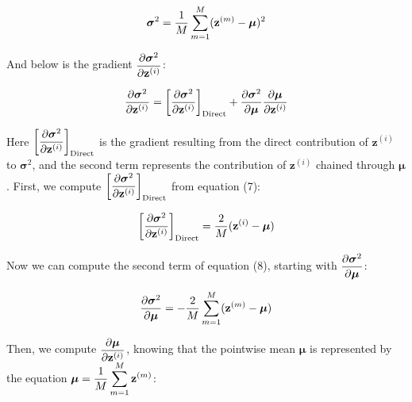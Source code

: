 \documentclass{article}
\begin{document}
\begin{multicols}{2}
\begin{equation}
    \boldsymbol{\sigma}^2 = {1\over M} 
    \sum_{m = 1}^M (\textbf{z}^{(m)} - \boldsymbol{\mu})^2
\end{equation}

And below is the gradient $\begin{aligned}
    {\partial \boldsymbol{\sigma}^2 \over \partial \textbf{z}^{(i)}}
\end{aligned}$:

\begin{equation}
    {\partial \boldsymbol{\sigma}^2 \over \partial \textbf{z}^{(i)}} = 
    \bigg[{\partial \boldsymbol{\sigma}^2 \over \partial \textbf{z}^{(i)}} \bigg]_{\text{Direct}}
    + {\partial \boldsymbol{\sigma}^2 \over \partial \boldsymbol{\mu}}
    {\partial \boldsymbol{\mu} \over \partial \textbf{z}^{(i)}}
\end{equation}

Here $\begin{aligned}
    \bigg[{\partial \boldsymbol{\sigma}^2 \over \partial \textbf{z}^{(i)}} \bigg]_{\text{Direct}}
\end{aligned}$ is the gradient resulting from the direct contribution of
$\textbf{z}^{(i)}$ to $\boldsymbol{\sigma}^2$, and the second term represents
the contribution of $\textbf{z}^{(i)}$ chained through $\boldsymbol{\mu}$.
First, we compute $\begin{aligned}
    \bigg[{\partial \boldsymbol{\sigma}^2 \over \partial \textbf{z}^{(i)}} \bigg]_{\text{Direct}}
\end{aligned}$ from equation (7):

\begin{equation}
    \bigg[{\partial \boldsymbol{\sigma}^2 \over \partial \textbf{z}^{(i)}} \bigg]_{\text{Direct}} =
    {2 \over M} (\textbf{z}^{(i)} - \boldsymbol{\mu}) \notag
\end{equation}

Now we can compute the second term of equation (8), starting with 
$\begin{aligned}
    {\partial \boldsymbol{\sigma}^2 \over \partial \boldsymbol{\mu}}
\end{aligned}$:

\begin{equation}
    {\partial \boldsymbol{\sigma}^2 \over \partial \boldsymbol{\mu}} = 
    -{2 \over M} \sum_{m=1}^M (\textbf{z}^{(m)} - \boldsymbol{\mu}) \notag
\end{equation}

Then, we compute $\begin{aligned}
    {\partial \boldsymbol{\mu} \over \partial \textbf{z}^{(i)}}
\end{aligned}$, knowing that the pointwise mean $\boldsymbol{\mu}$ is represented by the equation $\begin{aligned}
    \boldsymbol{\mu} = {1\over M} \sum_{m=1}^M\textbf{z}^{(m)}
\end{aligned}$:


\end{multicols}
\end{document}

